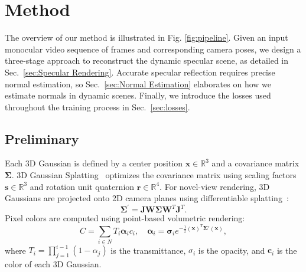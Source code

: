 \section{Method}
\label{sec:method}


The overview of our method is illustrated in Fig.  \ref{fig:pipeline}. Given an input monocular video sequence of frames and corresponding camera poses, we design a three-stage approach to reconstruct the dynamic specular scene, as detailed in Sec.~\ref{sec:Specular Rendering}. Accurate specular reflection requires precise normal estimation, so Sec.~\ref{sec:Normal Estimation} elaborates on how we estimate normals in dynamic scenes. Finally, we introduce the losses used throughout the training process in Sec.~\ref{sec:losses}.





\subsection{Preliminary} \label{sec:Deformation 3D Gaussians}


\vspace{3pt}  
Each 3D Gaussian is defined by a center position $\bm{x} \in \mathbb{R}^3$ and a covariance matrix $\bm{\Sigma}$. 3D Gaussian Splatting~\citep{kerbl20233d} optimizes the covariance matrix using scaling factors $\bm{s} \in \mathbb{R}^3$ and rotation unit quaternion $\bm{r} \in \mathbb{R}^4$. For novel-view rendering, 3D Gaussians are projected onto 2D camera planes using differentiable splatting~\citep{yifan2019differentiable}:
\begin{equation}
\mathbf{\Sigma}^{\prime}\mathbf{=}\mathbf{J}\mathbf{W}\mathbf{\Sigma}\mathbf{W}^{T}\mathbf{J}^{T}.
\end{equation}
Pixel colors are computed using point-based volumetric rendering:
\begin{equation}
C = \sum_{i \in {N}} {T}_i \mathbf{\alpha}_i {c}_i, \quad \mathbf{\alpha}_i = \mathbf{\sigma}_i e^{-\frac{1}{2} (\bm{x})^T \mathbf{\Sigma}' (\bm{x})},
\end{equation}
where ${T}_i = \prod_{j=1}^{i-1} (1 - \alpha_j)$ is the transmittance, $\sigma_i$ is the opacity, and $\mathbf{c}_i$ is the color of each 3D Gaussian.



